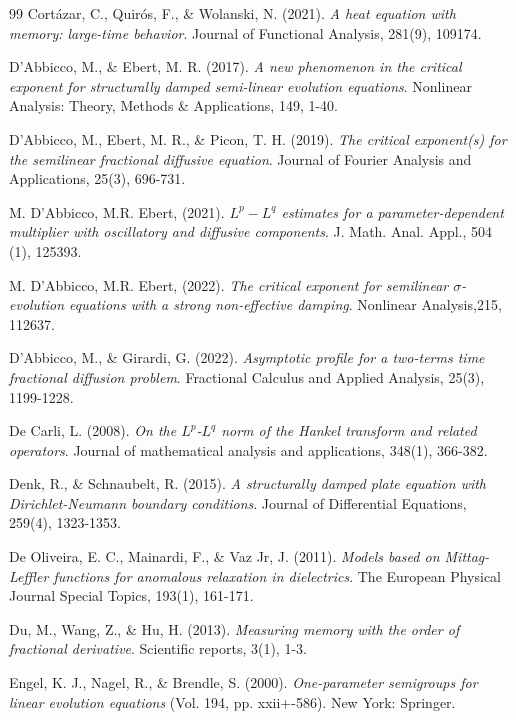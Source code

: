 \documentclass{amsart}
\theoremstyle{definition}
\theoremstyle{remark}
\numberwithin{equation}{section}
\begin{document}
{\begin{thebibliography}{99}
Cort\'azar, C., Quir\'os, F., \& Wolanski, N. (2021). \textit{A heat equation with memory: large-time behavior}. Journal of Functional Analysis, 281(9), 109174.


D’Abbicco, M., \& Ebert, M. R. (2017). \textit{A new phenomenon in the critical exponent for structurally damped semi-linear evolution equations}. Nonlinear Analysis: Theory, Methods \& Applications, 149, 1-40.

D’Abbicco, M., Ebert, M. R., \& Picon, T. H. (2019). \textit{The critical exponent(s) for the semilinear fractional diffusive equation}. Journal of Fourier Analysis and Applications, 25(3), 696-731.

M. D’Abbicco, M.R. Ebert, (2021).  \textit{$L^p-L^q$ estimates for a parameter-dependent multiplier with oscillatory and diffusive
	components}. J. Math. Anal. Appl., 504 (1), 125393.

M. D’Abbicco, M.R. Ebert, (2022). \textit{The critical exponent for semilinear $\sigma$-evolution equations with a strong non-effective damping}.
Nonlinear Analysis,215, 112637.


D’Abbicco, M., \& Girardi, G. (2022). \textit{Asymptotic profile for a two-terms time fractional diffusion problem}. Fractional Calculus and Applied Analysis, 25(3), 1199-1228.


De Carli, L. (2008). \textit{On the $L^p$-$L^q$ norm of the Hankel transform and related operators}. Journal of mathematical analysis and applications, 348(1), 366-382.

Denk, R., \& Schnaubelt, R. (2015). \textit{A structurally damped plate equation with Dirichlet-Neumann boundary conditions}. Journal of Differential Equations, 259(4), 1323-1353.

De Oliveira, E. C., Mainardi, F., \& Vaz Jr, J. (2011). \textit{Models based on Mittag-Leffler functions for anomalous relaxation in dielectrics}. The European Physical Journal Special Topics, 193(1), 161-171.

Du, M., Wang, Z., \& Hu, H. (2013). \textit{Measuring memory with the order of fractional derivative}. Scientific reports, 3(1), 1-3.

Engel, K. J., Nagel, R., \& Brendle, S. (2000). \textit{One-parameter semigroups for linear evolution equations} (Vol. 194, pp. xxii+-586). New York: Springer.


\end{thebibliography}}
\end{document}
